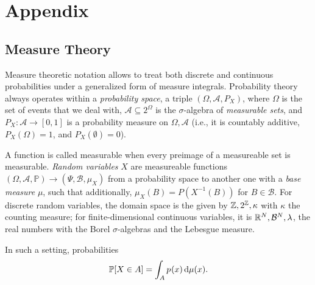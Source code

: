 \chapter{Appendix}
\label{ch:appendix}

\section{Measure Theory}
\label{sec:measure-theory}

Measure theoretic notation \parencite{kallenberg2006foundations} allows to treat both discrete and
continuous probabilities under a generalized form of measure integrals.  Probability theory always
operates within a \emph{probability space}, a triple \((\Omega, \mathcal{A}, P_X)\), where
\(\Omega\) is the set of events that we deal with, \(\mathcal{A} \subseteq 2^{\Omega}\) is the
\(\sigma\)-algebra of \emph{measurable sets}, and \(P_X: \mathcal{A} \to [0, 1]\) is a probability
measure on \(\Omega, \mathcal{A}\) (i.e., it is countably additive, \(P_X(\Omega) = 1\), and
\(P_X(\emptyset) = 0\)).

A function is called measurable when every preimage of a measureable set is measurable. \emph{Random
  variables} \(X\) are measureable functions
\((\Omega, \mathcal{A}, \mathbb{P}) \to (\Psi, \mathcal{B}, \mu_X)\) from a probability space to another
one with a \emph{base measure} \(\mu\), such that additionally, \(\mu_X(B) = P(X^{-1}(B))\) for
\(B \in \mathcal{B}\).  For discrete random variables, the domain space is the given by
\(\mathbb{Z}, 2^{\mathbb{Z}}, \kappa\) with \(\kappa\) the counting measure; for finite-dimensional continuous
variables, it is \(\mathbb{R}^N, \mathcal{B}^N, \lambda\), the real numbers with the Borel
\(\sigma\)-algebras and the Lebesgue measure.

In such a setting, probabilities
\begin{equation}
  \label{eq:measure-integral}
  \Prob{X \in A} = \int_{A} \prob{x} \dif\mu(x).
\end{equation}



